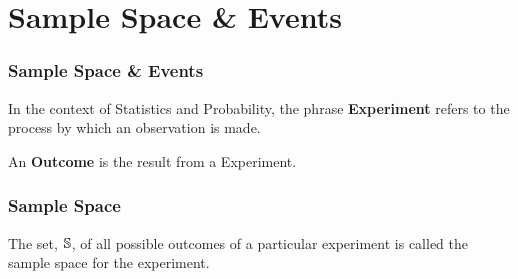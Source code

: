 \documentclass[compress]{beamer}
\begin{document}
\section{ Sample Space \& Events}







\begin{frame}
	\frametitle{ Sample Space \& Events}
	\begin{center}
	\begin{definition}
  In the context of Statistics and Probability,  the phrase {\bf Experiment } refers to the process by which an observation is made.\\
\vspace{.1in}
\end{definition}
\vspace{-.2in}
\vspace{.5in}
\pause

\begin{definition}[Outcome]
 An {\bf Outcome } is the result from a Experiment. \\
\vspace{.2in}
\end{definition}
\vspace{-.2in}
	\vspace{2in}
	\end{center}
\end{frame}





\begin{frame}
	\frametitle{ Sample Space}
		\begin{center}
	\begin{definition}
The set, $\mathbb{S}$,  of all possible outcomes of a particular experiment is called the sample space for the experiment. \\
\vspace{.2in}
\end{definition}
\vspace{-.2in}
\\
\vspace{.01in}
\pause
{}
\vspace{3in}

	\end{center}
\end{frame}
\end{document}
